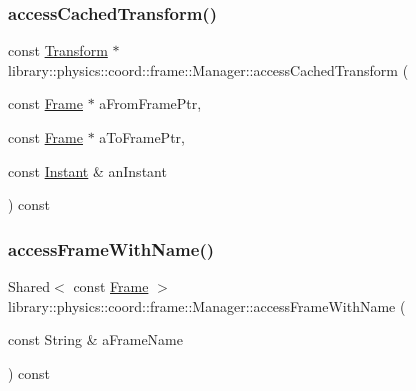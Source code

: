 \subsubsection{\texorpdfstring{access\+Cached\+Transform()}{accessCachedTransform()}}
{\footnotesize\ttfamily const \hyperlink{classlibrary_1_1physics_1_1coord_1_1_transform}{Transform} $\ast$ library\+::physics\+::coord\+::frame\+::\+Manager\+::access\+Cached\+Transform (\begin{DoxyParamCaption}\item[{const \hyperlink{classlibrary_1_1physics_1_1coord_1_1_frame}{Frame} $\ast$}]{a\+From\+Frame\+Ptr,  }\item[{const \hyperlink{classlibrary_1_1physics_1_1coord_1_1_frame}{Frame} $\ast$}]{a\+To\+Frame\+Ptr,  }\item[{const \hyperlink{classlibrary_1_1physics_1_1time_1_1_instant}{Instant} \&}]{an\+Instant }\end{DoxyParamCaption}) const}

\mbox{\label{classlibrary_1_1physics_1_1coord_1_1frame_1_1_manager_a13b4885965a111cebff6f04339d81596}} 
\subsubsection{\texorpdfstring{access\+Frame\+With\+Name()}{accessFrameWithName()}}
{\footnotesize\ttfamily Shared$<$ const \hyperlink{classlibrary_1_1physics_1_1coord_1_1_frame}{Frame} $>$ library\+::physics\+::coord\+::frame\+::\+Manager\+::access\+Frame\+With\+Name (\begin{DoxyParamCaption}\item[{const String \&}]{a\+Frame\+Name }\end{DoxyParamCaption}) const}

\mbox{\label{classlibrary_1_1physics_1_1coord_1_1frame_1_1_manager_a5b8f0ef450a7dfbda58f1c63e6efc7ac}} 
